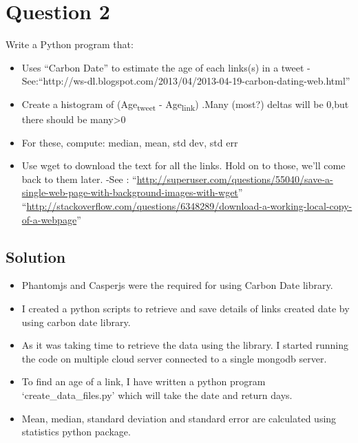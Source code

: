 
\section{Question 2}
\label{part2}
Write a Python program that:
\begin{itemize} 
\item Uses ``Carbon Date'' to estimate the age of each links(s) in a tweet
		-See:``http://ws-dl.blogspot.com/2013/04/2013-04-19-carbon-dating-web.html''
\item Create a histogram of (Age\textsubscript{tweet} - Age\textsubscript{link})
	    .Many (most?) deltas will be 0,but there should be many>0
\item For these, compute: median, mean, std dev, std err 


\item Use wget to download the text for all the links. Hold on to those,
		 we'll come back to them later.
		 -See :
		 	   ``\url{http://superuser.com/questions/55040/save-a-single-web-page-with-background-images-with-wget}''
		 	   ``\url{http://stackoverflow.com/questions/6348289/download-a-working-local-copy-of-a-webpage}''
\end{itemize}

\subsection{Solution}
\begin{itemize}
\item Phantomjs and Casperjs were the required for using Carbon Date library.
\item I created a python scripts to retrieve and save details of links created date by using carbon date library.
\item As it was taking time to retrieve the data using the library. I started running the code on multiple cloud server connected to a single mongodb server.
\item To find an age of a link, I have written a python program `create_data_files.py' which will take the date and return days. 
\item Mean, median, standard deviation and standard error are calculated using statistics python package.
\end{itemize}